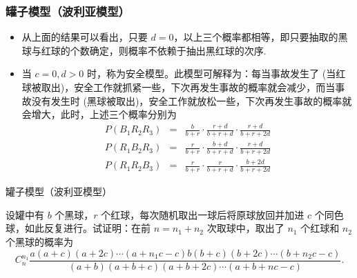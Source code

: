 \documentclass[Prob-All.tex]{subfiles}
\begin{document}
\begin{frame}
	\frametitle{罐子模型（波利亚模型）}
	\begin{itemize}[<+-|alert@+>]
		\item 从上面的结果可以看出，只要 $d=0$，以上三个概率都相等，即只要抽取的黑球与红球的个数确定，则概率不依赖于抽出黑红球的次序.
		\item 当 $c=0,d>0$ 时，称为安全模型。此模型可解释为：每当事故发生了 (当红球被取出)，安全工作就抓紧一些，下次再发生事故的概率就会减少，而当事故没有发生时 (黑球被取出)，安全工作就放松一些，下次再发生事故的概率就会增大，此时，上述三个概率分别为
		{\small\begin{eqnarray*}
				P(B_1R_2R_3) &=&\frac{b}{b+r}\cdot\frac{r+d}{b+r+d}\cdot\frac{r+d}{b+r+2d}\\
				P(R_1B_2R_3)&=&\frac{r}{b+r}\cdot\frac{b+d}{b+r+d}\cdot\frac{r+d}{b+r+2d}\\
				P(R_1R_2B_3) &=&\frac{r}{b+r}\cdot\frac{r}{b+r+d}\cdot\frac{b+2d}{b+r+2d}
		\end{eqnarray*}}
	\end{itemize}

\end{frame}

\begin{frame}{罐子模型（波利亚模型）}
	\begin{exam}
	设罐中有 $b$ 个黑球，$r$ 个红球，每次随机取出一球后将原球放回并加进 $c$ 个同色球，如此反复进行。试证明：在前 $n=n_1+n_2$ 次取球中，取出了 $n_1$ 个红球和 $n_2$ 个黑球的概率为
		$$C_n^{n_1}\frac{a(a+c)(a+2c)\cdots(a+n_1c-c)b(b+c)(b+2c)\cdots(b+n_2c-c)}{(a+b)(a+b+c)(a+b+2c)\cdots(a+b+nc-c)}.$$
	\end{exam}
\end{frame}
\end{document}
